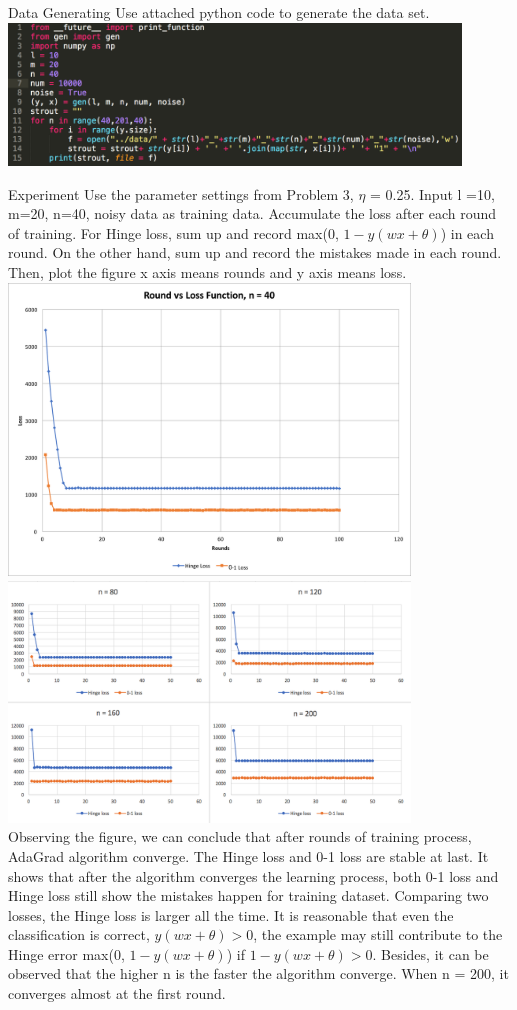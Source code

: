 \item[(a)] Data Generating
Use attached python code to generate the data set.\\
\includegraphics[width = 0.9\textwidth]{pythoncode4.png}
\item[(b)] Experiment
Use the parameter settings from Problem 3, $\eta$ = 0.25. Input l =10, m=20, n=40, noisy data as training data. Accumulate the loss after each round of training. For Hinge loss, sum up and record max(0, $1 - y(wx+\theta)$) in each round. On the other hand, sum up and record the mistakes made in each round. Then, plot the figure x axis means rounds and y axis means loss.\\
\includegraphics[width = 0.8\textwidth]{loss.png}\\
\includegraphics[width = 0.8\textwidth]{lossAll.png}\\
Observing the figure, we can conclude that after rounds of training process, AdaGrad algorithm converge. The Hinge loss and 0-1 loss are stable at last. It shows that after the algorithm converges the learning process, both 0-1 loss and Hinge loss still show the mistakes happen for training dataset. Comparing two losses, the Hinge loss is larger all the time. It is reasonable that even the classification is correct, $y(wx+\theta) > 0$, the example may still contribute to the Hinge error max(0, $1 - y(wx+\theta)$) if $1 - y(wx+\theta) > 0$. Besides, it can be observed that the higher n is the faster the algorithm converge. When n = 200, it converges almost at the first round.